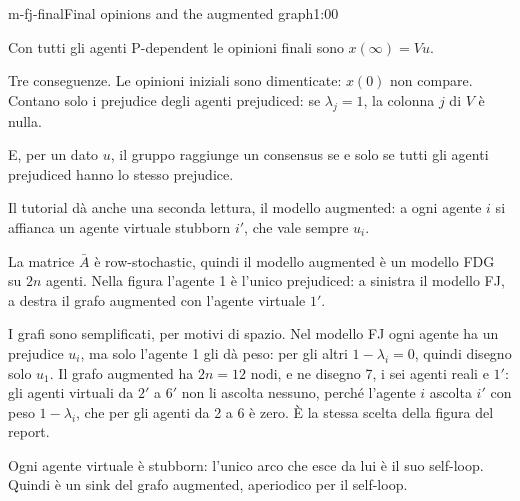 \begin{slide}{m-fj-final}{Final opinions and the augmented graph}{1:00 {\color{red}}}
  \begin{discorso}
    \item Con tutti gli agenti P-dependent le opinioni finali sono $x(\infty)=Vu$.
    \item Tre conseguenze. Le opinioni iniziali sono dimenticate: $x(0)$ non compare. Contano solo i prejudice degli agenti prejudiced: se $\lambda_j=1$, la colonna $j$ di $V$ è nulla.
    \item E, per un dato $u$, il gruppo raggiunge un consensus se e solo se tutti gli agenti prejudiced hanno lo stesso prejudice.
    \item Il tutorial dà anche una seconda lettura, il modello augmented: a ogni agente $i$ si affianca un agente virtuale stubborn $i'$, che vale sempre $u_i$.
    \item La matrice $\bar A$ è row-stochastic, quindi il modello augmented è un modello FDG su $2n$ agenti. Nella figura l'agente 1 è l'unico prejudiced: a sinistra il modello FJ, a destra il grafo augmented con l'agente virtuale $1'$.
    \item {\color{blue}I grafi sono semplificati, per motivi di spazio. Nel modello FJ ogni agente ha un prejudice $u_i$, ma solo l'agente 1 gli dà peso: per gli altri $1-\lambda_i=0$, quindi disegno solo $u_1$. Il grafo augmented ha $2n=12$ nodi, e ne disegno 7, i sei agenti reali e $1'$: gli agenti virtuali da $2'$ a $6'$ non li ascolta nessuno, perché l'agente $i$ ascolta $i'$ con peso $1-\lambda_i$, che per gli agenti da 2 a 6 è zero. È la stessa scelta della figura del report.}
    \item Ogni agente virtuale è {\color{red} } {\color{blue}stubborn: l'unico arco che esce} da lui {\color{red}     } {\color{blue}è} il suo {\color{red}    } {\color{blue}self-loop. Quindi è un sink del grafo augmented, aperiodico per il self-loop.}
    \item {\color{red}                                  }

\end{discorso}
\end{slide}
